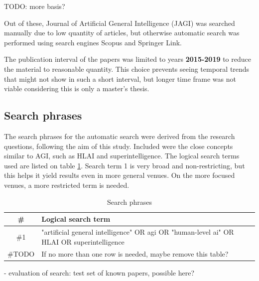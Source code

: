 \documentclass[utf8,english]{gradu3}
\begin{document}
TODO: more basis?


Out of these, Journal of Artificial General
Intelligence (JAGI) was searched manually due to low quantity of articles, but
otherwise automatic search was performed using search engines Scopus and
Springer Link.

The publication interval of the papers was limited to years \textbf{2015-2019}
to reduce the material to reasonable quantity. This choice prevents seeing
temporal trends that might not show in such a short interval, but longer time
frame was not viable considering this is only a master's thesis.

\subsection{Search phrases}

The search phrases for the automatic search were derived from the research
questions, following the aim of this study. Included were the close concepts
similar to AGI, such as HLAI and superintelligence. The logical search terms
used are listed on table \ref{table:search_terms}. Search term 1 is very broad
and non-restricting, but this helps it yield results even in more general
venues. On the more focused venues, a more restricted term is needed.



\begin{table}[h]
  \caption{Search phrases}
  \centering
  \begin{tabular}{| c | p{12cm} |}
    \hline\hline
    \textbf{\#} & \textbf{Logical search term} \\
    \hline
    \#1 & "artificial general intelligence" OR agi OR "human-level ai" OR HLAI 
    OR superintelligence \\
    \hline
    \#TODO & If no more than one row is needed, maybe remove this table? \\
    \hline
  \end{tabular}
  \label{table:search_terms}
\end{table}


- evaluation of search: test set of known papers, possible here?
\end{document}
